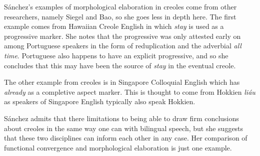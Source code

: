 \documentclass{article}
\newcommand{\lexi}[1]{\textit{#1}}
\begin{document}
    Sánchez's examples of morphological elaboration in creoles come from other researchers, namely Siegel and Bao, so she goes less in depth here.
    The first example comes from Hawaiian Creole English in which \lexi{stay} is used as a progressive marker.
    She notes that the progressive was only attested early on among Portuguese speakers in the form of reduplication and the adverbial \lexi{all time}.
    Portuguese also happens to have an explicit progressive, and so she concludes that this may have been the source of \lexi{stay} in the eventual creole.

    The other example from creoles is in Singapore Colloquial English which has \lexi{already} as a completive aspect marker.
    This is thought to come from Hokkien \lexi{liáu} as speakers of Singapore English typically also speak Hokkien.

    Sánchez admits that there limitations to being able to draw firm conclusions about creoles in the same way one can with bilingual speech, but she suggests that these two disciplines can inform each other in any case.
    Her comparison of functional convergence and morphological elaboration is just one example.
    \printbibliography
\end{document}
